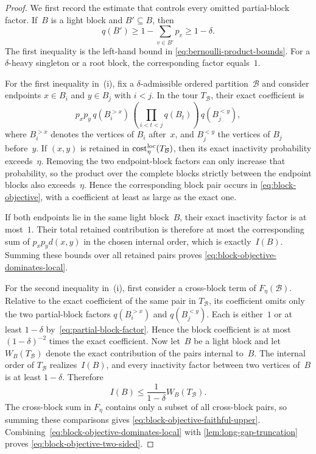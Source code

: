 \documentclass[12pt,a4paper,oneside]{report}
\begin{document}
\begin{proof}
We first record the estimate that controls every omitted partial-block
factor.  If~$B$ is a light block and $B'\subseteq B$, then
\begin{equation}\label{eq:partial-block-factor}
    q(B')
    \ge 1-\sum_{v\in B'}p_v
    \ge 1-\delta.
\end{equation}
The first inequality is the left-hand bound in
\cref{eq:bernoulli-product-bounds}.
For a $\delta$-heavy singleton or a root block, the corresponding factor equals~$1$.

For the first inequality in~(i), fix a $\delta$-admissible ordered
partition~$\mathcal B$ and consider
endpoints $x\in B_i$ and $y\in B_j$ with $i<j$.  In the tour
$T_{\mathcal B}$, their exact coefficient is
\[
    p_xp_y\,
    q(B_i^{>x})\,
    \left(\prod_{i<t<j}q(B_t)\right)\,
    q(B_j^{<y}),
\]
where $B_i^{>x}$ denotes the vertices of $B_i$ after~$x$, and
$B_j^{<y}$ the vertices of $B_j$ before~$y$.  If $(x,y)$ is retained in
$\operatorname{cost}^{\operatorname{loc}}_{\eta}(T_{\mathcal B})$, then its exact inactivity probability
exceeds~$\eta$.  Removing the two endpoint-block factors can only increase
that probability, so the product over the complete blocks strictly between
the endpoint blocks also exceeds~$\eta$.  Hence the corresponding block pair occurs in
\cref{eq:block-objective}, with a coefficient at least as large as the exact
one.

If both endpoints lie in the same light block~$B$, their exact inactivity
factor is at most~$1$.  Their total retained contribution is therefore at
most the corresponding sum of $p_xp_y d(x,y)$ in the chosen internal order,
which is exactly~$I(B)$.  Summing these bounds over all retained pairs proves
\cref{eq:block-objective-dominates-local}.

For the second inequality in~(i), first consider a cross-block term of
$F_\eta(\mathcal B)$.  Relative to the exact coefficient of the same pair in
$T_{\mathcal B}$, its coefficient omits only the two partial-block factors
$q(B_i^{>x})$ and $q(B_j^{<y})$.  Each is either~$1$ or at least $1-\delta$
by~\cref{eq:partial-block-factor}.  Hence the block coefficient is at most
$(1-\delta)^{-2}$ times the exact coefficient.  Now let~$B$ be a light block
and let $W_B(T_{\mathcal B})$ denote the exact contribution of the pairs
internal to~$B$.  The internal order of $T_{\mathcal B}$ realizes~$I(B)$,
and every inactivity factor between two vertices of~$B$ is at least
$1-\delta$.  Therefore
\[
    I(B)\le \frac{1}{1-\delta}W_B(T_{\mathcal B}).
\]
The cross-block sum in $F_\eta$ contains only a subset of all cross-block
pairs, so summing these comparisons gives
\cref{eq:block-objective-faithful-upper}.
Combining~\cref{eq:block-objective-dominates-local} with
\cref{lem:long-gap-truncation} proves
\cref{eq:block-objective-two-sided}.


\end{proof}
\end{document}
